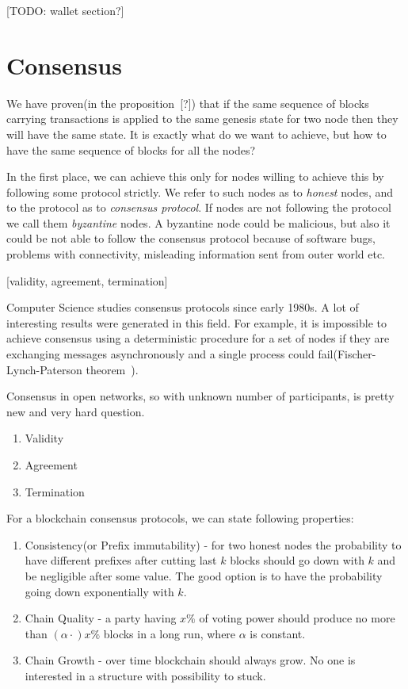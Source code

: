 \documentclass[]{report}   %
\begin{document}
[TODO: wallet section?]

\section{Consensus}

We have proven(in the proposition~[?]) that if the same sequence of blocks carrying transactions is applied to the same genesis state for two node then they will have the same state. It is exactly what do we want to achieve, but how to have the same sequence of blocks for all the nodes? 

In the first place, we can achieve this only for nodes willing to achieve this by following some protocol strictly. We refer to such nodes as to \textit{honest} nodes, and to the protocol as to \textit{consensus protocol}. If nodes are not following the protocol we call them \textit{byzantine} nodes. A byzantine node could be malicious, but also it could be not able to follow the consensus protocol because of software bugs, problems with connectivity, misleading information sent from outer world etc. 

[validity, agreement, termination]

Computer Science studies consensus protocols since early 1980s. A lot of interesting results were generated in this field. For example, it is impossible to achieve consensus using a deterministic procedure for a set of nodes if they are exchanging messages asynchronously and a single process could fail(Fischer-Lynch-Paterson theorem~\cite{}). 

Consensus in open networks, so with unknown number of participants, is pretty new and very hard question. 

\begin{enumerate}
\item{Validity}
\item{Agreement}
\item{Termination}
\end{enumerate}

For a blockchain consensus protocols, we can state following properties:

\begin{enumerate}
\item{Consistency(or Prefix immutability)} - for two honest nodes the probability to have different prefixes after cutting last \(k\) blocks should go down with \(k\) and be negligible after some value. The good option is to have the probability going down exponentially with \(k\).
\item{Chain Quality} - a party having \(x\%\) of voting power should produce no more than \((\alpha \cdot) x \%\) blocks in a long run, where \(\alpha\) is constant.
\item{Chain Growth} - over time blockchain should always grow. No one is interested in a structure with possibility to stuck. 
\end{enumerate}
\end{document}
